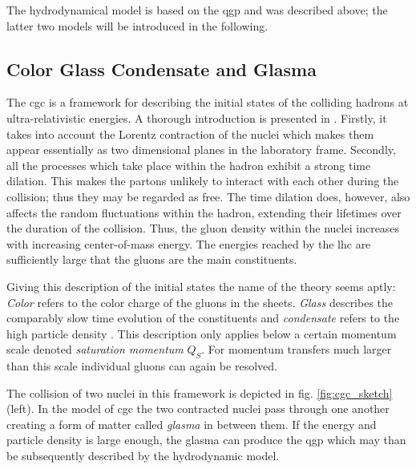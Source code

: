 The hydrodynamical model is based on the \gls{qgp} and was described above; the latter two models will be introduced in the following.


\subsection{Color Glass Condensate and Glasma}
\label{sec:CGC}

The \gls{cgc} is a framework for describing the initial states of the colliding hadrons at ultra-relativistic energies. A thorough introduction is presented in \cite{Gelis2013}. Firstly, it takes into account the Lorentz contraction of the nuclei which makes them appear essentially as two dimensional planes in the laboratory frame. Secondly, all the processes which take place within the hadron exhibit a strong time dilation. This makes the partons unlikely to interact with each other during the collision; thus they may be regarded as free. The time dilation does, however, also affects the random fluctuations within the hadron, extending their lifetimes over the duration of the collision. Thus, the gluon density within the nuclei increases with increasing center-of-mass energy. The energies reached by the \gls{lhc} are sufficiently large that the gluons are the main constituents.

Giving this description of the initial states the name of the theory seems aptly: \emph{Color} refers to the color charge of the gluons in the sheets. \emph{Glass} describes the comparably slow time evolution of the constituents and \emph{condensate} refers to the high particle density \cite{Wojciech2010}. This description only applies below a certain momentum scale denoted \emph{saturation momentum} $Q_S$. For momentum transfers much larger than this scale individual gluons can again be resolved.

The collision of two nuclei in this framework is depicted in fig. \ref{fig:cgc_sketch} (left). In the model of \gls{cgc} the two contracted nuclei pass through one another creating a form of matter called \emph{glasma} in between them. If the energy and particle density is large enough, the glasma can produce the \gls{qgp} which may than be subsequently described by the hydrodynamic model.

